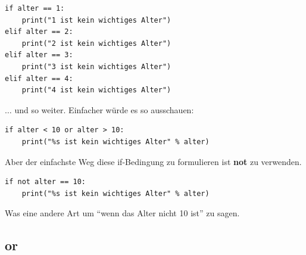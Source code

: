 \begin{Verbatim}[frame=single]
if alter == 1:
    print("1 ist kein wichtiges Alter")
elif alter == 2:
    print("2 ist kein wichtiges Alter")
elif alter == 3:
    print("3 ist kein wichtiges Alter")
elif alter == 4:
    print("4 ist kein wichtiges Alter")
\end{Verbatim}

\noindent
$\ldots$ und so weiter. Einfacher würde es so ausschauen:
\begin{Verbatim}[frame=single]
if alter < 10 or alter > 10:
    print("%s ist kein wichtiges Alter" % alter)
\end{Verbatim}

\noindent
Aber der einfachste Weg diese if-Bedingung zu formulieren ist \textbf{not} zu verwenden.

\begin{Verbatim}[frame=single]
if not alter == 10:
    print("%s ist kein wichtiges Alter" % alter)
\end{Verbatim}

\noindent
Was eine andere Art um ``wenn das Alter nicht 10 ist'' zu sagen.

\subsection*{or}

